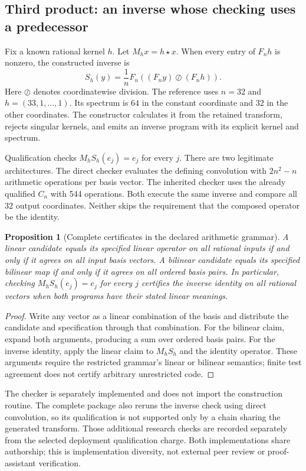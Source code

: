 \documentclass[11pt,letterpaper]{article}
\newtheorem{proposition}[theorem]{Proposition}
\theoremstyle{definition}\newtheorem{definition}[theorem]{Definition}
\theoremstyle{remark}\newtheorem{remark}[theorem]{Remark}
\begin{document}
\subsection{Third product: an inverse whose checking uses a predecessor}
Fix a known rational kernel $h$. Let $M_hx=h\star x$. When every entry of $F_nh$ is nonzero, the constructed inverse is
\begin{equation}
 S_h(y)=\frac1nF_n\left((F_ny)\oslash(F_nh)\right).
 \label{eq:inverse}
\end{equation}
Here $\oslash$ denotes coordinatewise division. The reference uses $n=32$ and $h=(33,1,\ldots,1)$. Its spectrum is $64$ in the constant coordinate and $32$ in the other coordinates. The constructor calculates it from the retained transform, rejects singular kernels, and emits an inverse program with its explicit kernel and spectrum.

Qualification checks $M_hS_h(e_j)=e_j$ for every $j$. There are two legitimate architectures. The direct checker evaluates the defining convolution with $2n^2-n$ arithmetic operations per basis vector. The inherited checker uses the already qualified $C_n$ with 544 operations. Both execute the same inverse and compare all 32 output coordinates. Neither skips the requirement that the composed operator be the identity.

\begin{proposition}[Complete certificates in the declared arithmetic grammar]
\label{prop:basis}
A linear candidate equals its specified linear operator on all rational inputs if and only if it agrees on all input basis vectors. A bilinear candidate equals its specified bilinear map if and only if it agrees on all ordered basis pairs. In particular, checking $M_hS_h(e_j)=e_j$ for every $j$ certifies the inverse identity on all rational vectors when both programs have their stated linear meanings.
\end{proposition}
\begin{proof}
Write any vector as a linear combination of the basis and distribute the candidate and specification through that combination. For the bilinear claim, expand both arguments, producing a sum over ordered basis pairs. For the inverse identity, apply the linear claim to $M_hS_h$ and the identity operator. These arguments require the restricted grammar's linear or bilinear semantics; finite test agreement does not certify arbitrary unrestricted code.
\end{proof}

The checker is separately implemented and does not import the construction routine. The complete package also reruns the inverse check using direct convolution, so its qualification is not supported only by a chain sharing the generated transform. Those additional research checks are recorded separately from the selected deployment qualification charge. Both implementations share authorship; this is implementation diversity, not external peer review or proof-assistant verification.
\end{document}
